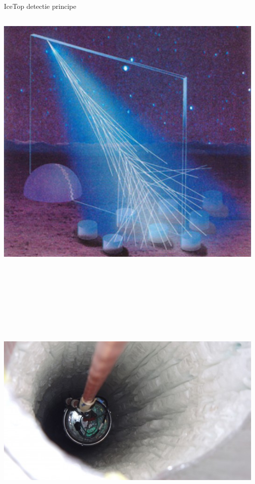 \Tr
\begin{center}
{\blue IceTop detectie principe}\\[5mm] 
\includegraphics[keepaspectratio,height=14cm]{cr-shower}
\end{center}

\Tr
\begin{center}
\includegraphics[keepaspectratio,height=14cm]{hole2}
\end{center}

